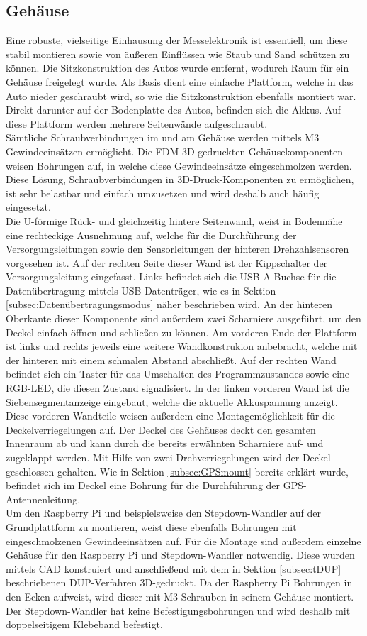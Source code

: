 \subsection{Gehäuse}
\label{subsec:elekCasing}
Eine robuste, vielseitige Einhausung der Messelektronik ist essentiell, um diese stabil montieren sowie von äußeren Einflüssen wie Staub und Sand schützen zu können. Die Sitzkonstruktion des Autos wurde entfernt, wodurch Raum für ein Gehäuse freigelegt wurde. Als Basis dient eine einfache Plattform, welche in das Auto nieder geschraubt wird, so wie die Sitzkonstruktion ebenfalls montiert war. Direkt darunter auf der Bodenplatte des Autos, befinden sich die Akkus. Auf diese Plattform werden mehrere Seitenwände aufgeschraubt.\\
Sämtliche Schraubverbindungen im und am Gehäuse werden mittels M3 Gewindeeinsätzen ermöglicht. Die \ac{FDM}-3D-gedruckten Gehäusekomponenten weisen Bohrungen auf, in welche diese Gewindeeinsätze eingeschmolzen werden. Diese Lösung, Schraubverbindungen in 3D-Druck-Komponenten zu ermöglichen, ist sehr belastbar und einfach umzusetzen und wird deshalb auch häufig eingesetzt. \\
Die U-förmige Rück- und gleichzeitig hintere Seitenwand, weist in Bodennähe eine rechteckige Ausnehmung auf, welche für die Durchführung der Versorgungsleitungen sowie den Sensorleitungen der hinteren Drehzahlsensoren vorgesehen ist. Auf der rechten Seite dieser Wand ist der Kippschalter der Versorgungsleitung eingefasst. Links befindet sich die \ac{USB}-A-Buchse für die Datenübertragung mittels \ac{USB}-Datenträger, wie es in Sektion \ref{subsec:Datenübertragungsmodus} näher beschrieben wird. An der hinteren Oberkante dieser Komponente sind außerdem zwei Scharniere ausgeführt, um den Deckel einfach öffnen und schließen zu können. Am vorderen Ende der Plattform ist links und rechts jeweils eine weitere Wandkonstrukion anbebracht, welche mit der hinteren mit einem schmalen Abstand abschließt. Auf der rechten Wand befindet sich ein Taster für das Umschalten des Programmzustandes sowie eine \ac{RGB}-\ac{LED}, die diesen Zustand signalisiert. In der linken vorderen Wand ist die Siebensegmentanzeige eingebaut, welche die aktuelle Akkuspannung anzeigt. Diese vorderen Wandteile weisen außerdem eine Montagemöglichkeit für die Deckelverriegelungen auf. Der Deckel des Gehäuses deckt den gesamten Innenraum ab und kann durch die bereits erwähnten Scharniere auf- und zugeklappt werden. Mit Hilfe von zwei Drehverriegelungen wird der Deckel geschlossen gehalten. Wie in Sektion \ref{subsec:GPSmount} bereits erklärt wurde, befindet sich im Deckel eine Bohrung für die Durchführung der GPS-Antennenleitung.\\
Um den Raspberry Pi und beispielsweise den Stepdown-Wandler auf der Grundplattform zu montieren, weist diese ebenfalls Bohrungen mit eingeschmolzenen Gewindeeinsätzen auf. Für die Montage sind außerdem einzelne Gehäuse für den Raspberry Pi und Stepdown-Wandler notwendig. Diese wurden mittels \ac{CAD} konstruiert und anschließend mit dem in Sektion \ref{subsec:tDUP} beschriebenen \ac{DUP}-Verfahren 3D-gedruckt. Da der Raspberry Pi Bohrungen in den Ecken aufweist, wird dieser mit M3 Schrauben in seinem Gehäuse montiert. Der Stepdown-Wandler hat keine Befestigungsbohrungen und wird deshalb mit doppelseitigem Klebeband befestigt. 